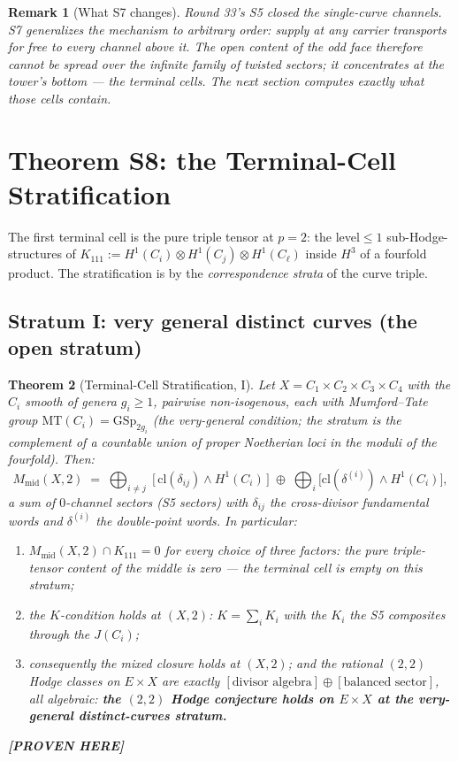 \documentclass[11pt]{article}
\newtheorem{theorem}{Theorem}
\newtheorem{remark}[theorem]{Remark}
\newcommand{\PROVEN}{\textbf{[PROVEN HERE]}}
\newcommand{\MT}{\mathrm{MT}}
\newcommand{\GSp}{\mathrm{GSp}}
\begin{document}
\begin{remark}[What S7 changes]
Round 33's S5 closed the single-curve channels. S7 generalizes the
mechanism to arbitrary order: \emph{supply at any carrier transports for
free to every channel above it}. The open content of the odd face
therefore cannot be spread over the infinite family of twisted sectors;
it concentrates at the tower's bottom --- the terminal cells. The next
section computes exactly what those cells contain.
\end{remark}

\section{Theorem S8: the Terminal-Cell Stratification}

The first terminal cell is the pure triple tensor at $p=2$:
the level${}\le1$ sub-Hodge-structures of
$K_{111}:=H^{1}(C_{i})\otimes H^{1}(C_{j})\otimes H^{1}(C_{\ell})$
inside $H^{3}$ of a fourfold product. The stratification is by the
\emph{correspondence strata} of the curve triple.

\subsection{Stratum I: very general distinct curves (the open stratum)}

\begin{theorem}[Terminal-Cell Stratification, I]\label{thm:s8a}
Let $X=C_1\times C_2\times C_3\times C_4$ with the $C_i$ smooth of genera
$g_i\ge1$, pairwise non-isogenous, each with Mumford--Tate group
$\MT(C_i)=\GSp_{2g_i}$ (the very-general condition; the stratum is the
complement of a countable union of proper Noetherian loci in the moduli
of the fourfold). Then:
\[
M_{\mathrm{mid}}(X,2)\;=\;\bigoplus_{i\ne j}\;
\bigl[\,\mathrm{cl}(\delta_{ij})\wedge H^{1}(C_i)\,\bigr]\;\oplus\;
\bigoplus_i\bigl[\mathrm{cl}(\delta^{(i)})\wedge H^1(C_i)\bigr],
\]
a sum of $0$-channel sectors (S5 sectors) with $\delta_{ij}$ the
cross-divisor fundamental words and $\delta^{(i)}$ the double-point
words. In particular:
\begin{enumerate}[label=(\alph*)]
\item $M_{\mathrm{mid}}(X,2)\cap K_{111}=0$ for every choice of three
factors: the pure triple-tensor content of the middle is \emph{zero} ---
the terminal cell is \emph{empty} on this stratum;
\item the $K$-condition holds at $(X,2)$: $K=\sum_i K_i$ with the $K_i$
the S5 composites through the $J(C_i)$;
\item consequently the mixed closure holds at $(X,2)$; and the
rational $(2,2)$ Hodge classes on $E\times X$ are exactly
$[\text{divisor algebra}]\oplus[\text{balanced sector}]$, all algebraic:
\textbf{the $(2,2)$ Hodge conjecture holds on $E\times X$ at the
very-general distinct-curves stratum.}
\end{enumerate}
\PROVEN{}
\end{theorem}
\end{document}
